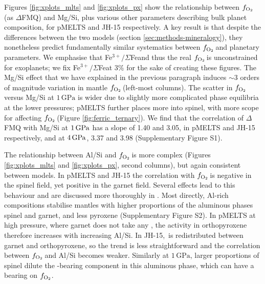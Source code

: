 \documentclass[fleqn,usenatbib,twocolumn]{mnras}
\newcommand{\fo}{$f_{\ce{O2}}$}
\newcommand{\ferric}{\ce{Fe^{3+}}}
\newcommand{\xfer}{Fe$^{3+}/\Sigma$Fe}
\newcommand{\todo}[1]{\textit{\textcolor{violet}{{#1}}}}
\begin{document}
Figures \ref{fig:xplots_mlts} and \ref{fig:xplots_px} show the relationship between \fo\,(as $\Delta$FMQ) and Mg/Si, plus various other parameters describing bulk planet composition, for pMELTS and JH-15 respectively. A key result is that despite the differences between the two models (section \ref{sec:methods-mineralogy}), they nonetheless predict fundamentally similar systematics between \fo\,and planetary parameters. We emphasise that \xfer\;and thus the real \fo\,is unconstrained for exoplanets; we fix \xfer\;at 3\% for the sake of creating these figures. The Mg/Si effect that we have explained in the previous paragraph induces $\sim$3 orders of magnitude variation in mantle \fo\,(left-most columns). The scatter in \fo\,versus Mg/Si at $1\,\text{GPa}$ is wider due to slightly more complicated phase equilibria at the lower pressures; pMELTS further places more \ferric\;into spinel, with more scope for affecting \fo\,(Figure \ref{fig:ferric_ternary}). We find that the correlation of $\Delta$FMQ with Mg/Si at $1\,{\rm GPa}$ has a slope of 1.40 and 3.05, in pMELTS and JH-15 respectively, and at $4\,{\rm GPa}$, 3.37 and 3.98 (Supplementary Figure S1).

The relationship between Al/Si and \fo\,is more complex (Figures \ref{fig:xplots_mlts} and \ref{fig:xplots_px}, second columns), but again consistent between models. In pMELTS and JH-15 the correlation with \fo\,is negative in the spinel field, yet positive in the garnet field. Several effects lead to this behaviour and are discussed more thoroughly in \citet{stolper_effects_2020}. Most directly, Al-rich compositions stabilise mantles with higher proportions of the aluminous phases spinel and garnet, and less pyroxene (Supplementary Figure S2). In pMELTS at high pressure, where garnet does not take any \ferric, the  activity in orthopyroxene therefore increases with increasing Al/Si. In JH-15, \ferric\,is redistributed between garnet and orthopyroxene, so the trend is less straightforward and the correlation between \fo\,and Al/Si becomes weaker. Similarly at $1\,\text{GPa}$, larger proportions of spinel dilute the \ferric-bearing component in this aluminous phase, which can have a bearing on \fo.

\end{document}

